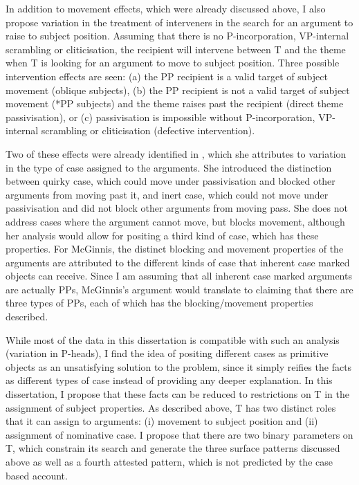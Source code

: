 In addition to movement effects, which were already discussed above, I also propose variation in the treatment of interveners in the search for an argument to raise to subject position. Assuming that there is no P-incorporation, VP-internal scrambling or cliticisation, the recipient will intervene between T and the theme when T is looking for an argument to move to subject position. Three possible intervention effects are seen: (a) the PP recipient is a valid target of subject movement (oblique subjects), (b) the PP recipient is not a valid target of subject movement (*PP subjects) and the theme raises past the recipient (direct theme passivisation), or (c) passivisation is impossible without P-incorporation, VP-internal scrambling or cliticisation (defective intervention). 

Two of these effects were already identified in \cite{McGinnis.1998b}, which she attributes to variation in the type of case assigned to the arguments. She introduced the distinction between quirky case, which could move under passivisation and blocked other arguments from moving past it, and inert case, which could not move under passivisation and did not block other arguments from moving pass. She does not address cases where the argument cannot move, but blocks movement, although her analysis would allow for positing a third kind of case, which has these properties. For McGinnis, the distinct blocking and movement properties of the arguments are attributed to the different kinds of case that inherent case marked objects can receive. Since I am assuming that all inherent case marked arguments are actually PPs, McGinnis's argument would translate to claiming that there are three types of PPs, each of which has the blocking/movement properties described.

While most of the data in this dissertation is compatible with such an analysis (variation in P-heads), I find the idea of positing different cases as primitive objects as an unsatisfying solution to the problem, since it simply reifies the facts as different types of case instead of providing any deeper explanation. In this dissertation, I propose that these facts can be reduced to restrictions on T in the assignment of subject properties. As described above, T has two distinct roles that it can assign to arguments: (i) movement to subject position and (ii) assignment of nominative case. I propose that there are two binary parameters on T, which constrain its search and generate the three surface patterns discussed above as well as a fourth attested pattern, which is not predicted by the case based account.

